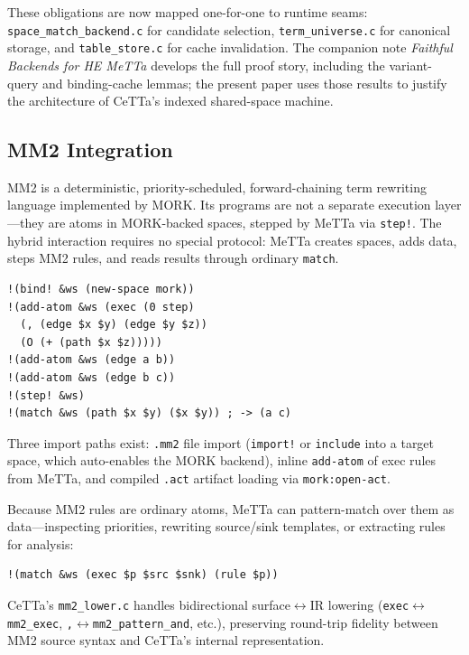 \documentclass[11pt]{article}
\newcommand{\code}[1]{\texttt{#1}}
\newcommand{\CeTTa}{\textup{CeTTa}}
\begin{document}
These obligations are now mapped one-for-one to runtime seams:
\code{space\_match\_backend.c} for candidate selection, \code{term\_universe.c}
for canonical storage, and \code{table\_store.c} for cache invalidation.  The
companion note \emph{Faithful Backends for HE MeTTa} develops the full proof
story, including the variant-query and binding-cache lemmas; the present
paper uses those results to justify the architecture of \CeTTa{}'s indexed
shared-space machine.

\subsection{MM2 Integration}

MM2 is a deterministic, priority-scheduled, forward-chaining term rewriting
language implemented by MORK\@.  Its programs are not a separate execution
layer---they are atoms in MORK-backed spaces, stepped by MeTTa via
\code{step!}.  The hybrid interaction requires no special protocol: MeTTa
creates spaces, adds data, steps MM2 rules, and reads results through ordinary
\code{match}.

\begin{verbatim}
!(bind! &ws (new-space mork))
!(add-atom &ws (exec (0 step)
  (, (edge $x $y) (edge $y $z))
  (O (+ (path $x $z)))))
!(add-atom &ws (edge a b))
!(add-atom &ws (edge b c))
!(step! &ws)
!(match &ws (path $x $y) ($x $y)) ; -> (a c)
\end{verbatim}

Three import paths exist: \code{.mm2} file import (\code{import!} or
\code{include} into a target space, which auto-enables the MORK backend),
inline \code{add-atom} of exec rules from MeTTa, and compiled \code{.act}
artifact loading via \code{mork:open-act}.

Because MM2 rules are ordinary atoms, MeTTa can pattern-match over them as
data---inspecting priorities, rewriting source/sink templates, or extracting
rules for analysis:
\begin{verbatim}
!(match &ws (exec $p $src $snk) (rule $p))
\end{verbatim}

\CeTTa{}'s \code{mm2\_lower.c} handles bidirectional
surface$\leftrightarrow$IR lowering
(\code{exec}$\leftrightarrow$\code{mm2\_exec},
\code{,}$\leftrightarrow$\code{mm2\_pattern\_and}, etc.), preserving
round-trip fidelity between MM2 source syntax and \CeTTa{}'s internal
representation.

\end{document}
